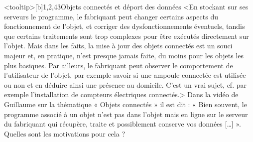 \begin{quiz}[title={Informatique embarquée et objets connectés}]
\begin{quizquestion}<tooltip>[b]{1,2,4}{3}{Objets connectés et déport des données}
<En stockant sur ses serveurs le programme, le fabriquant peut changer certains aspects du fonctionnement de l’objet, et corriger des dysfonctionnements éventuels, tandis que certains traitements sont trop complexes pour être exécutés directement sur l’objet. Mais dans les faits, la mise à jour des objets connectés est un souci majeur et, en pratique, n’est presque jamais faite, du moins pour les objets les plus basiques.
Par ailleurs, le fabriquant peut observer le comportement de l’utilisateur de l’objet, par exemple savoir si une ampoule connectée est utilisée ou non et en déduire ainsi une présence au domicile. C'est un vrai sujet, cf. par exemple l'installation de compteurs électriques connectés.>
Dans la vidéo de Guillaume sur la thématique « Objets connectés » il est dit : « Bien souvent, le programme associé à un objet n’est pas dans l’objet mais en ligne sur le serveur du fabriquant qui récupère, traite et possiblement conserve vos données […] ».\\
Quelles sont les motivations pour cela ?
\end{quizquestion}


\end{quiz}
